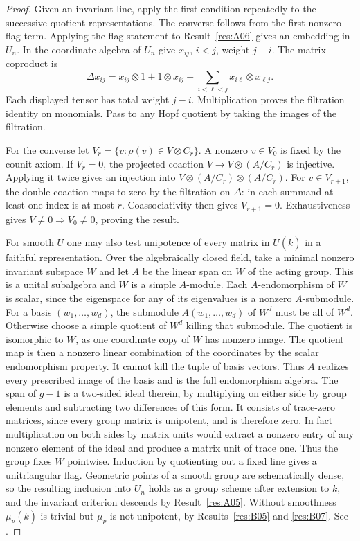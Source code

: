 \documentclass[11pt,a4paper,openany,oneside]{book}
\theoremstyle{resultstyle}
\theoremstyle{definition}
\numberwithin{equation}{chapter}
\begin{document}
\begin{proof}
Given an invariant line, apply the first condition repeatedly to the
successive quotient representations. The converse follows from the
first nonzero flag term. Applying the flag statement to
Result~\ref{res:A06} gives an embedding in \(U_n\).
In the coordinate algebra of \(U_n\) give \(x_{ij}\), \(i<j\), weight
\(j-i\). The matrix coproduct is
\[
 \Delta x_{ij}=x_{ij}\otimes1+1\otimes x_{ij}
   +\sum_{i<\ell<j} x_{i\ell}\otimes x_{\ell j}.
\]
Each displayed tensor has total weight \(j-i\). Multiplication
proves the filtration identity on monomials. Pass to any Hopf
quotient by taking the images of the filtration.

For the converse let \(V_r=\{v:\rho(v)\in V\otimes C_r\}\).
A nonzero \(v\in V_0\) is fixed by the counit axiom. If \(V_r=0\),
the projected coaction \(V\to V\otimes(A/C_r)\) is injective.
Applying it twice gives an injection into
\(V\otimes(A/C_r)\otimes(A/C_r)\). For \(v\in V_{r+1}\),
the double coaction maps to zero by the filtration on \(\Delta\):
in each summand at least one index is at most \(r\).
Coassociativity then gives \(V_{r+1}=0\). Exhaustiveness gives
\(V\ne0\Rightarrow V_0\ne0\), proving the result.

For smooth \(U\) one may also test unipotence of every matrix in
\(U(\bar k)\) in a faithful representation. Over the algebraically
closed field, take a minimal nonzero invariant subspace \(W\) and let
\(A\) be the linear span on \(W\) of the acting group. This is a unital
subalgebra and \(W\) is a simple \(A\)-module. Each \(A\)-endomorphism
of \(W\) is scalar, since the eigenspace for any of its eigenvalues is
a nonzero \(A\)-submodule. For a basis \((w_1,\ldots,w_d)\), the
submodule \(A(w_1,\ldots,w_d)\) of \(W^d\) must be all of \(W^d\).
Otherwise choose a simple quotient of \(W^d\) killing that submodule.
The quotient is isomorphic to \(W\), as one coordinate copy of \(W\)
has nonzero image. The quotient map is then a nonzero linear
combination of the coordinates by the scalar endomorphism property.
It cannot kill the tuple of basis vectors. Thus \(A\) realizes every
prescribed image of the basis and is the full endomorphism algebra.
The span of \(g-1\) is a two-sided ideal therein, by multiplying on
either side by group elements and subtracting two differences of this
form. It consists of trace-zero matrices, since every group matrix is
unipotent, and is therefore zero. In fact multiplication on both sides
by matrix units would extract a nonzero entry of any nonzero element
of the ideal and produce a matrix unit of trace one. Thus the group
fixes \(W\) pointwise. Induction by quotienting out a fixed line gives
a unitriangular flag. Geometric points of a smooth group are
schematically dense, so the resulting inclusion into \(U_n\) holds
as a group scheme after extension to \(\bar k\), and the invariant
criterion descends by Result~\ref{res:A05}. Without smoothness
\(\mu_p(\bar k)\) is trivial but \(\mu_p\) is not unipotent, by
Results~\ref{res:B05} and \ref{res:B07}.
See \cite[Proposition 14.3, Theorem 14.5 and Corollaries 14.6, 14.11--14.12]{milne}.
\end{proof}
\end{document}
